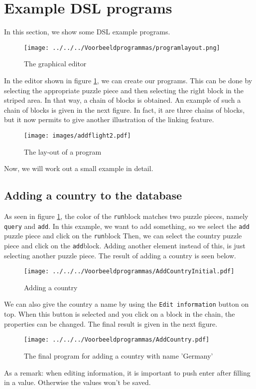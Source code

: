 
\section{Example DSL programs}
In this section, we show some DSL example programs. %

\begin{figure}[H]
	\centering
	\texttt{[image: ../../../Voorbeeldprogrammas/programlayout.png]}
	\caption{The graphical editor}
	\label{ex:DSLlayout}
\end{figure}
\noindent In the editor shown in figure \ref{ex:DSLlayout}, we can create our programs. This can be done by selecting the appropriate puzzle piece and then selecting the right block in the striped area. In that way, a chain of blocks is obtained. An example of such a chain of blocks is given in the next figure. In fact, it are three chains of blocks, but it now permits to give another illustration of the linking feature.
\begin{figure}[H]
	\centering
	\texttt{[image: images/addflight2.pdf]}
	\caption{The lay-out of a program}
	\label{ex:generalexample}
\end{figure}
Now, we will work out a small example in detail.

\subsection{Adding a country to the database}
As seen in figure \ref{ex:DSLlayout}, the color of the \texttt{run}block matches two puzzle pieces, namely \texttt{query} and \texttt{add}.
In this example, we want to add something, so we select the \texttt{add} puzzle piece and click on the \texttt{run}block Then, we can select the country puzzle piece and click on the \texttt{add}block. Adding another element instead of this, is just selecting another puzzle piece. The result of adding a country is seen below.
\begin{figure}[H]
	\centering
	\texttt{[image: ../../../Voorbeeldprogrammas/AddCountryInitial.pdf]}
	\caption{Adding a country}
	\label{ex:addCountryInitial}
\end{figure}
\noindent We can also give the country a name by using the \texttt{Edit information} button on top. When this button is selected and you click on a block in the chain, the properties can be changed. The final result is given in the next figure.
\begin{figure}[H]
	\centering
	\texttt{[image: ../../../Voorbeeldprogrammas/AddCountry.pdf]}
	\caption{The final program for adding a country with name 'Germany'}
	\label{ex:addCountry}
\end{figure}
As a remark: when editing information, it is important to push enter after filling in a value. Otherwise the values won't be saved.

